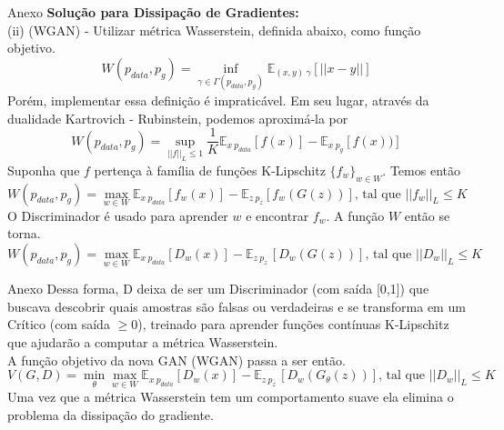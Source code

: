 \documentclass[10pt]{beamer}
\begin{document}
\begin{frame}[fragile]{Anexo}
  \small
  \textbf{Solução para Dissipação de Gradientes:}\\
  (ii) (WGAN) - Utilizar métrica Wasserstein, definida abaixo, como função objetivo.
  $$W(p_{data},p_g) = \inf_{\gamma\in\Gamma(p_{data},p_g)}\mathbb{E}_{(x,y)~\gamma}[||x-y||] $$
  \pause
  Porém, implementar essa definição é impraticável. Em seu lugar, através da dualidade Kartrovich - Rubinstein, podemos aproximá-la por
  $$W(p_{data},p_g) = \sup_{||f||_L\leq1} \frac{1}{K}\mathbb{E}_{x~p_{data}}[f(x)]- \mathbb{E}_{x~p_g}[f(x))]$$
  \pause
  Suponha que $f$ pertença à família de funções K-Lipschitz $\{f_w\}_{w \in W}$. Temos então
  $$W(p_{data},p_g) = \max_{w \in W} \mathbb{E}_{x~p_{data}}[f_w(x)] - \mathbb{E}_{z~p_z}[f_w(G(z))] \text{, tal que } ||f_w||_L \leq K$$
  \pause
  O Discriminador é usado para aprender $w$ e encontrar $f_w$. A função $W$ então se torna.
  $$W(p_{data},p_g) = \max_{w \in W} \mathbb{E}_{x~p_{data}}[D_w(x)] - \mathbb{E}_{z~p_z~}[D_w(G(z))] \text{, tal que } ||D_w||_L \leq K$$
\end{frame}

\begin{frame}[fragile]{Anexo}
  \small
  Dessa forma, D deixa de ser um Discriminador (com saída [0,1]) que buscava descobrir quais amostras são falsas ou verdadeiras e se transforma em um Crítico (com saída $\geq0$), treinado para aprender funções contínuas K-Lipschitz que ajudarão a computar a métrica Wasserstein. \\
  A função objetivo da nova GAN (WGAN) passa a ser então.
  $$V(G,D) = \min_{\theta} \max_{w \in W} \mathbb{E}_{x~p_{data}}[D_w(x)] - \mathbb{E}_{z~p_z~}[D_w(G_{\theta}(z))] \text{, tal que } ||D_w||_L \leq K$$
  Uma vez que a métrica Wasserstein tem um comportamento suave ela elimina o problema da dissipação do gradiente.
\end{frame}
\end{document}
